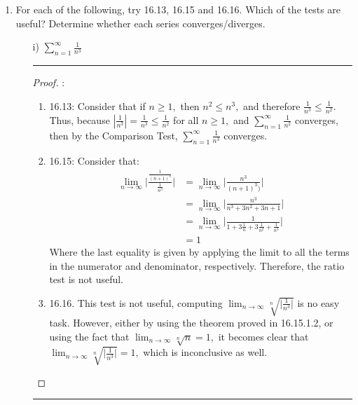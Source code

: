 \documentclass[openany, amssymb, psamsfonts]{amsart}
\newcommand{\abs}[1]{\lvert #1 \rvert}
\theoremstyle{definition}
\numberwithin{equation}{section}
\begin{document}
\begin{enumerate}
\begin{enumerate}
\begin{proof}
\end{proof} \vspace{4pt}     \hrule   \vspace{4pt}
\item 
 For each of the following, try 16.13, 16.15 and 16.16. Which of the tests are useful? Determine whether each series converges/diverges.
\begin{enumerate}
\item[i)] $\displaystyle\sum_{n=1}^\infty \frac{1}{n^3}$
 \vspace{4pt}     \hrule   \vspace{4pt}\begin{proof}:\\
     \begin{enumerate}
         \item 16.13: Consider that if $n\geq 1,$ then $n^2\leq n^3,$ and therefore $\frac{1}{n^3}\leq  \frac{1}{n^2}.$ Thus, because $|\frac{1}{n^3}| = \frac{1}{n^3}\leq  \frac{1}{n^2}$ for all $n\geq 1,$ and $\displaystyle\sum_{n=1}^\infty \frac{1}{n^2}$ converges, then by the Comparison Test, $\displaystyle\sum_{n=1}^\infty\frac{1}{n^3}$ converges.
         \item 16.15: Consider that:
         \begin{align*}
             \displaystyle\lim_{n\to \infty}\abs{\frac{\frac{1}{(n+1)^3}}{\frac{1}{n^3}}} &= \displaystyle\lim_{n\to \infty}\abs{\frac{n^3}{(n+1)^3)}}\\
             &= \displaystyle\lim_{n\to \infty}\abs{\frac{n^3}{n^3 + 3n^2 + 3n +1}}\\
             &= \displaystyle\lim_{n\to \infty}\abs{\frac{1}{1 + 3\frac{1}{n} + 3\frac{1}{n^2} +\frac{1}{n^3}}}\\
             &= 1
         \end{align*}
         Where the last equality is given by applying the limit to all the terms in the numerator and denominator, respectively. Therefore, the ratio test is not useful.
         \item 16.16. This test is not useful, computing $\displaystyle\lim_{n\to\infty}\sqrt[n]{\abs{\frac{1}{n^3}}}$ is no easy task. However, either by using the theorem proved in 16.15.1.2, or using the fact that $\displaystyle\lim_{n\to \infty}\sqrt[n]{n} =1,$ it becomes clear that $\displaystyle\lim_{n\to\infty}\sqrt[n]{\abs{\frac{1}{n^3}}} =1,$ which is inconclusive as well. 
     \end{enumerate}
 \end{proof}\vspace{4pt}     \hrule   \vspace{4pt}

\end{enumerate}
\end{enumerate}
\end{enumerate}
\end{document}
